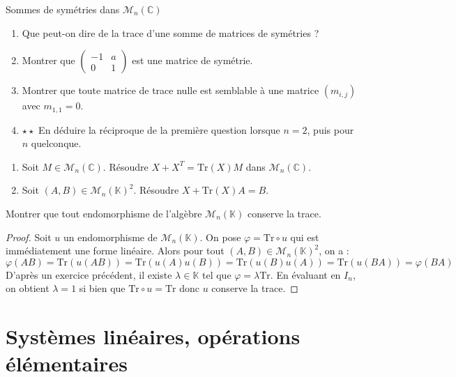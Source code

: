 \documentclass[french,a4paper]{article}
\newcommand{\C}{\mathbb{C}}
\newcommand{\K}{\mathbb{K}}
\newcommand{\Tr}{\text{Tr}}
\theoremstyle{plain}
\theoremstyle{definition}
\theoremstyle{remark}
\begin{document}
\begin{ex}{Sommes de symétries dans $\mathcal{M}_n(\C)$}
	\begin{enumerate}
		\item Que peut-on dire de la trace d'une somme de matrices de symétries ?
		\item Montrer que $\displaystyle\begin{pmatrix}
			-1&a\\
			0&1
		\end{pmatrix}$ est une matrice de symétrie.
		\item Montrer que toute matrice de trace nulle est semblable à une matrice $(m_{i,j})$ avec $m_{1,1}=0$.
		\item $\star\star$ En déduire la réciproque de la première question lorsque $n=2$, puis pour $n$ quelconque.
	\end{enumerate}
\end{ex}

\begin{ex}{}
	\begin{enumerate}
		\item Soit $M\in\mathcal{M}_n(\C)$. Résoudre $X+X^T=\Tr(X)M$ dans $\mathcal{M}_n(\C)$.
		\item Soit $(A,B)\in\mathcal{M}_n(\K)^2$. Résoudre $X+\Tr(X)A=B$.
	\end{enumerate}
\end{ex}

\begin{ex}{}
	Montrer que tout endomorphisme de l'algèbre $\mathcal{M}_n(\K)$ conserve la trace.
\end{ex}
\begin{proof}
	Soit $u$ un endomorphisme de $\mathcal{M}_n(\K)$. On pose $\varphi=\Tr\circ u$ qui est immédiatement une forme linéaire. Alors pour tout $(A,B)\in\mathcal{M}_n(\K)^2$, on a : $$\varphi(AB)=\Tr(u(AB))=\Tr(u(A)u(B))=\Tr(u(B)u(A))=\Tr(u(BA))=\varphi(BA)$$ D'après un exercice précédent, il existe $\lambda\in\K$ tel que $\varphi=\lambda\Tr$. En évaluant en $I_n$, on obtient $\lambda=1$ si bien que $\Tr\circ u=\Tr$ donc $u$ conserve la trace.
\end{proof}

\section{Systèmes linéaires, opérations élémentaires}
\end{document}
